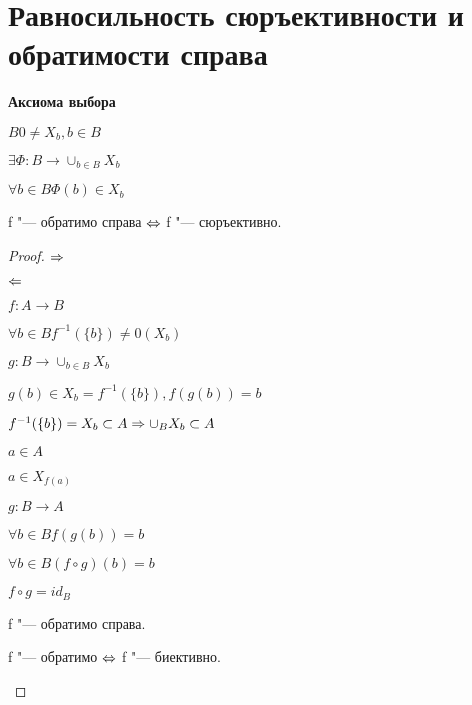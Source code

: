 ﻿\section{Равносильность сюръективности и обратимости справа}

{\bf Аксиома выбора}

$B 0 \ne X_b, b \in B$

$\exists \Phi: B \to \cup_{b \in B}X_b$

$\forall b \in B \Phi(b) \in X_{b}$

\begin{theorem}{}

f "--- обратимо справа $\Leftrightarrow$ f "--- сюръективно.

\end{theorem}

\begin{proof}
$\Rightarrow$

$\Leftarrow$

$f: A \to B$

$\forall b \in B f^{-1}(\{b\}) \ne 0(X_b)$

$g: B \to \cup_{b \in B}X_b$

$g(b) \in X_b = f^{-1}(\{b\}), f(g(b))= b$

$f^{-1}(\{b\}) = X_b \subset A \Rightarrow \cup_{B} X_b \subset A$

$a \in A$

$a \in X_{f(a)}$

$g: B \to A$

$\forall b \in B f(g(b)) = b$

$\forall b \in B (f \circ g)(b) = b$

$f \circ g = id_{B}$

f "--- обратимо справа.

\begin{conseq}{}

f "--- обратимо $\Leftrightarrow$ f "--- биективно.

\end{conseq}
\end{proof}